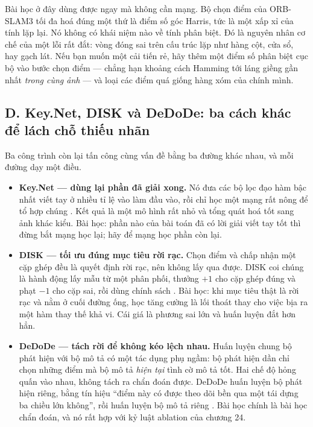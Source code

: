 \documentclass[../../deep_learning.tex]{subfiles}
\begin{document}
Bài học ở đây dùng được ngay mà không cần mạng. Bộ chọn điểm của ORB-SLAM3 tối đa hoá đúng một thứ là điểm số góc Harris, tức là một xấp xỉ của tính lặp lại. Nó không có khái niệm nào về tính phân biệt. Đó là nguyên nhân cơ chế của một lỗi rất đắt: vòng đóng sai trên cấu trúc lặp như hàng cột, cửa sổ, hay gạch lát. Nếu bạn muốn một cải tiến rẻ, hãy thêm một điểm số phân biệt cục bộ vào bước chọn điểm --- chẳng hạn khoảng cách Hamming tới láng giềng gần nhất \emph{trong cùng ảnh} --- và loại các điểm quá giống hàng xóm của chính mình.

\subsection{D. Key.Net, DISK và DeDoDe: ba cách khác để lách chỗ thiếu nhãn}
Ba công trình còn lại tấn công cùng vấn đề bằng ba đường khác nhau, và mỗi đường dạy một điều.

\begin{itemize}
\item \textbf{Key.Net --- dùng lại phần đã giải xong.} Nó đưa các bộ lọc đạo hàm bậc nhất viết tay ở nhiều tỉ lệ vào làm đầu vào, rồi chỉ học một mạng rất nông để tổ hợp chúng \cite{barroso2019keynet}. Kết quả là một mô hình rất nhỏ và tổng quát hoá tốt sang ảnh khác kiểu. Bài học: phần nào của bài toán đã có lời giải viết tay tốt thì đừng bắt mạng học lại; hãy để mạng học phần còn lại.
\item \textbf{DISK --- tối ưu đúng mục tiêu rời rạc.} Chọn điểm và chấp nhận một cặp ghép đều là quyết định rời rạc, nên không lấy  qua được. DISK coi chúng là hành động lấy mẫu từ một phân phối, thưởng \(+1\) cho cặp ghép đúng và phạt \(-1\) cho cặp sai, rồi dùng  chính sách \cite{tyszkiewicz2020disk}. Bài học: khi mục tiêu thật là rời rạc và nằm ở cuối đường ống, học tăng cường là lối thoát thay cho việc bịa ra một hàm thay thế khả vi. Cái giá là phương sai  lớn và huấn luyện đắt hơn hẳn.
\item \textbf{DeDoDe --- tách rời để không kéo lệch nhau.} Huấn luyện chung bộ phát hiện với bộ mô tả có một tác dụng phụ ngầm: bộ phát hiện dần chỉ chọn những điểm mà bộ mô tả \emph{hiện tại} tình cờ mô tả tốt. Hai chế độ hỏng quấn vào nhau, không tách ra chẩn đoán được. DeDoDe huấn luyện bộ phát hiện riêng, bằng tín hiệu ``điểm này có được theo dõi bền qua một tái dựng ba chiều lớn không'', rồi huấn luyện bộ mô tả riêng \cite{edstedt2024dedode}. Bài học chính là bài học chẩn đoán, và nó rất hợp với kỷ luật ablation của chương 24.
\end{itemize}
\end{document}
